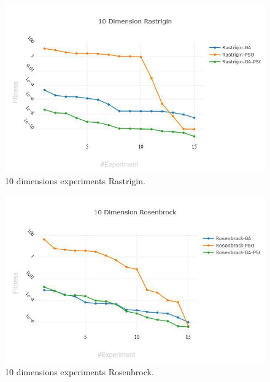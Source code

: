 \documentclass[runningheads]{llncs}
\begin{document}
        \begin{figure}[htp]
          \includegraphics[width=\textwidth]{img/10-rastrigin.jpg}
          \caption{10 dimensions experiments Rastrigin.} \label{fig1}
          \end{figure}

          \begin{figure}[htp]
            \includegraphics[width=\textwidth]{img/10-rosenbrock.jpg}
            \caption{10 dimensions experiments Rosenbrock.} \label{fig1}
            \end{figure}
\end{document}
